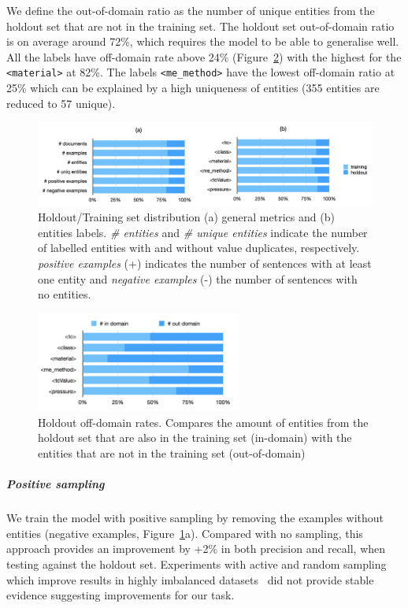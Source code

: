 \documentclass{article}
\begin{document}
We define the out-of-domain ratio as the number of unique entities from the holdout set that are not in the training set. 
The holdout set out-of-domain ratio is on average around 72\%, which requires the model to be able to generalise well. 
All the labels have off-domain rate above 24\%  (Figure~\ref{fig:out-domain-holdout}) with the highest for the \texttt{<material>} at 82\%. The labels \texttt{<me\_method>} have the lowest off-domain ratio at 25\% which can be explained by a high uniqueness of entities (355 entities are reduced to 57 unique). 

\begin{figure}[ht]
\centering
\includegraphics[width=\textwidth]{holdout-training-set}
\caption{Holdout/Training set distribution (a) general metrics and (b) entities labels.
\textit{\# entities} and \textit{\# unique entities} indicate the number of labelled entities with and without value duplicates, respectively. \textit{positive examples} (+) indicates the number of sentences with at least one entity and \textit{negative examples} (-) the number of sentences with no entities.}
\label{fig:training-holdout-set-distribution}
\end{figure}

\begin{figure}[ht]
\centering
\includegraphics[width=0.6\textwidth]{out-domain-holdout-unique}
\caption{Holdout off-domain rates. Compares the amount of entities from the holdout set that are also in the training set (in-domain) with the entities that are not in the training set (out-of-domain)}
\label{fig:out-domain-holdout}
\end{figure}

\subparagraph{Positive sampling} 
We train the model with positive sampling by removing the examples without entities (negative examples, Figure~\ref{fig:training-holdout-set-distribution}a). 
Compared with no sampling, this approach provides an improvement by +2\% in both precision and recall, when testing against the holdout set. 
Experiments with active and random sampling which improve results in highly imbalanced datasets~\cite{lopez2021mining} did not provide stable evidence suggesting improvements for our task. 
\end{document}
